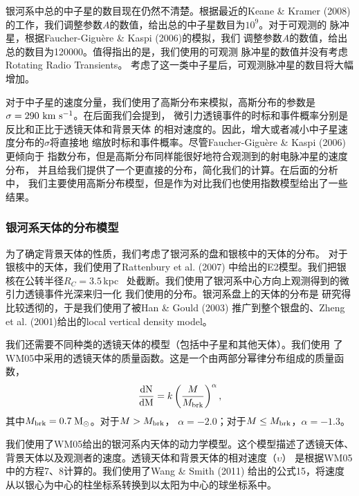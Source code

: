 银河系中总的中子星的数目现在仍然不清楚。根据最近的Keane \& Kramer (2008)\supercite{Keane}
的工作，我们调整参数$A$的数值，给出总的中子星数目为$10^9$。对于可观测的
脉冲星，根据Faucher-Gigu{\`e}re \& Kaspi (2006)\supercite{Faucher}的模拟，我们
调整参数$A$的数值，给出总的数目为120000。值得指出的是，我们使用的可观测
脉冲星的数值并没有考虑Rotating Radio Transients\supercite{McLaughlin06}。
考虑了这一类中子星后，可观测脉冲星的数目将大幅增加\supercite{Keane}。

对于中子星的速度分量，我们使用了高斯分布来模拟，高斯分布的参数是
$\sigma=290\ \rm{km\ s^{-1}}$\supercite{Faucher}。在后面我们会提到，
微引力透镜事件的时标和事件概率分别是反比和正比于透镜天体和背景天体
的相对速度的。因此，增大或者减小中子星速度分布的$\sigma$将直接地
缩放时标和事件概率。尽管Faucher-Gigu{\`e}re \& Kaspi (2006)更倾向于
指数分布，但是高斯分布同样能很好地符合观测到的射电脉冲星的速度分布\supercite{hobbs}，
并且给我们提供了一个更直接的分布，简化我们的计算。在后面的分析中，
我们主要使用高斯分布模型，但是作为对比我们也使用指数模型给出了一些
结果。

\subsubsection{银河系天体的分布模型}

为了确定背景天体的性质，我们考虑了银河系的盘和银核中的天体的分布。
对于银核中的天体，我们使用了Rattenbury et al. (2007)\supercite{Rattenbury}
中给出的E2模型。我们把银核在公转半径$R_{C}=3.5$\,kpc~\supercite{Bissantz}
处截断。我们使用了银河系中心方向上观测得到的微引力透镜事件光深来归一化
我们使用的分布\supercite{Calchi,popowski}。银河系盘上的天体的分布是
研究得比较透彻的，于是我们使用了被Han \& Gould (2003)\supercite{han}
推广到整个银盘的、Zheng et al. (2001)\supercite{zheng}给出的local vertical 
density model。

我们还需要不同种类的透镜天体的模型（包括中子星和其他天体）。我们使用
了WM05中采用的透镜天体的质量函数。这是一个由两部分幂律分布组成的质量函数，
%
\begin{equation}
\frac{\rm{d}N}{\rm{d}M}=k\left(\frac{M}{M_{\rm{brk}}}\right)^{\rm{\alpha}},
\end{equation}
%
其中$M_{\rm{brk}}=0.7$\,$\rm{M_{\odot}}$。对于$M>M_{\rm{brk}}$，
$\alpha=-2.0$；对于$M\leq M_{\rm{brk}}$，$\alpha=-1.3$。

我们使用了WM05给出的银河系内天体的动力学模型。这个模型描述了透镜天体、
背景天体以及观测者的速度。透镜天体和背景天体的相对速度（$\upsilon$）
是根据WM05中的方程7、8计算的。我们使用了Wang \& Smith (2011)\supercite{wang}
给出的公式15，将速度从以银心为中心的柱坐标系转换到以太阳为中心的球坐标系中。

